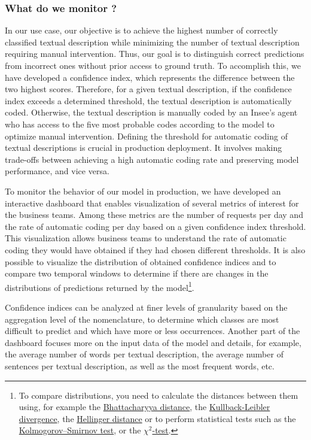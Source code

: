 \subsubsection{What do we monitor ?}

In our use case, our objective is to achieve the highest number of correctly classified textual description while minimizing the number of textual description requiring manual intervention. Thus, our goal is to distinguish correct predictions from incorrect ones without prior access to ground truth. To accomplish this, we have developed a confidence index, which represents the difference between the two highest scores. Therefore, for a given textual description, if the confidence index exceeds a determined threshold, the textual description is automatically coded. Otherwise, the textual description is manually coded by an Insee's agent who has access to the five most probable codes according to the model to optimize manual intervention. Defining the threshold for automatic coding of textual descriptions is crucial in production deployment. It involves making trade-offs between achieving a high automatic coding rate and preserving model performance, and vice versa.

To monitor the behavior of our model in production, we have developed an interactive dashboard that enables visualization of several metrics of interest for the business teams. Among these metrics are the number of requests per day and the rate of automatic coding per day based on a given confidence index threshold. This visualization allows business teams to understand the rate of automatic coding they would have obtained if they had chosen different thresholds. It is also possible to visualize the distribution of obtained confidence indices and to compare two temporal windows to determine if there are changes in the distributions of predictions returned by the model\footnote{To compare distributions, you need to calculate the distances between them using, for example the \href{https://en.wikipedia.org/wiki/Bhattacharyya_distance}{Bhattacharyya distance}, the \href{https://en.wikipedia.org/wiki/Kullback\%E2\%80\%93Leibler_divergence}{Kullback-Leibler divergence}, the \href{https://en.wikipedia.org/wiki/Hellinger_distance}{Hellinger distance} or to perform statistical tests such as the \href{https://en.wikipedia.org/wiki/Kolmogorov\%E2\%80\%93Smirnov_test}{Kolmogorov–Smirnov test}, or the \href{https://en.wikipedia.org/wiki/Chi-squared_test}{$\chi^2$-test}.}. 

Confidence indices can be analyzed at finer levels of granularity based on the aggregation level of the nomenclature, to determine which classes are most difficult to predict and which have more or less occurrences. Another part of the dashboard focuses more on the input data of the model and details, for example, the average number of words per textual description, the average number of sentences per textual description, as well as the most frequent words, etc.

